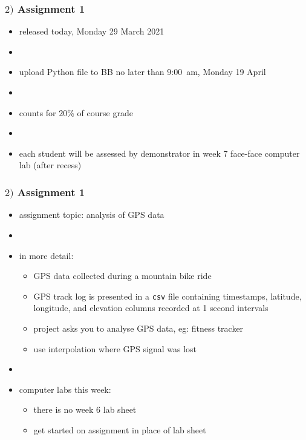 \documentclass[english,14pt]{beamer}
\newcommand\red[1]{{\color{red} #1}}
\begin{document}

\begin{frame}[fragile]

\frametitle{$2)$ Assignment 1}

\begin{itemize}
	\item released today, Monday 29 March 2021
	\item[]
	\item upload Python file to BB no later than \red{9:00~am, Monday 19 April}
	\item[]
	\item counts for $20$\% of course grade
	\item[]
	\item each student will be assessed by demonstrator in week 7 face-face computer lab (after recess)

\end{itemize}

\end{frame}


\begin{frame}[fragile]

\frametitle{$2)$ Assignment 1}

\begin{itemize}
	\item assignment topic: analysis of GPS data
	\item[]
	\item in more detail:
	\begin{itemize}
		\item GPS data collected during a mountain bike ride
		\item GPS track log is presented in a \texttt{csv} file containing timestamps, latitude, longitude, and elevation
columns recorded at 1 second intervals
		\item project asks you to analyse GPS data, eg: fitness tracker
		\item use interpolation where GPS signal was lost
	\end{itemize}
	\item[]
	\item computer labs this week:
	\begin{itemize}
		\item there is no week 6 lab sheet
		\item get started on assignment in place of lab sheet
	\end{itemize}
\end{itemize}

\end{frame}
\end{document}
